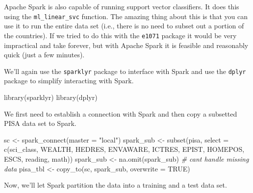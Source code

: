 \documentclass[
]{book}
\newenvironment{Shaded}{\begin{snugshade}}{\end{snugshade}}
\newcommand{\AttributeTok}[1]{\textcolor[rgb]{0.77,0.63,0.00}{#1}}
\newcommand{\CommentTok}[1]{\textcolor[rgb]{0.56,0.35,0.01}{\textit{#1}}}
\newcommand{\ConstantTok}[1]{\textcolor[rgb]{0.00,0.00,0.00}{#1}}
\newcommand{\DecValTok}[1]{\textcolor[rgb]{0.00,0.00,0.81}{#1}}
\newcommand{\FunctionTok}[1]{\textcolor[rgb]{0.00,0.00,0.00}{#1}}
\newcommand{\NormalTok}[1]{#1}
\newcommand{\OtherTok}[1]{\textcolor[rgb]{0.56,0.35,0.01}{#1}}
\newcommand{\SpecialCharTok}[1]{\textcolor[rgb]{0.00,0.00,0.00}{#1}}
\newcommand{\StringTok}[1]{\textcolor[rgb]{0.31,0.60,0.02}{#1}}
\begin{document}
Apache Spark is also capable of running support vector classifiers. It does this using the \texttt{ml\_linear\_svc} function. The amazing thing about this is that you can use it to run the entire data set (i.e., there is no need to subset out a portion of the countries). If we tried to do this with the \texttt{e1071} package it would be very impractical and take forever, but with Apache Spark it is feasible and reasonably quick (just a few minutes).

We'll again use the \texttt{sparklyr} package to interface with Spark and use the \texttt{dplyr} package to simplify interacting with Spark.

\begin{Shaded}
\begin{Highlighting}[]
\FunctionTok{library}\NormalTok{(sparklyr)}
\FunctionTok{library}\NormalTok{(dplyr)}
\end{Highlighting}
\end{Shaded}

We first need to establish a connection with Spark and then copy a subsetted PISA data set to Spark.

\begin{Shaded}
\begin{Highlighting}[]
\NormalTok{sc }\OtherTok{\textless{}{-}} \FunctionTok{spark\_connect}\NormalTok{(}\AttributeTok{master =} \StringTok{"local"}\NormalTok{)}
\NormalTok{spark\_sub }\OtherTok{\textless{}{-}} \FunctionTok{subset}\NormalTok{(pisa, }
                    \AttributeTok{select =} \FunctionTok{c}\NormalTok{(sci\_class, WEALTH, HEDRES, ENVAWARE, ICTRES,}
\NormalTok{                               EPIST, HOMEPOS, ESCS, reading, math))}
\NormalTok{spark\_sub }\OtherTok{\textless{}{-}} \FunctionTok{na.omit}\NormalTok{(spark\_sub) }\CommentTok{\# can\textquotesingle{}t handle missing data}
\NormalTok{pisa\_tbl }\OtherTok{\textless{}{-}} \FunctionTok{copy\_to}\NormalTok{(sc, spark\_sub, }\AttributeTok{overwrite =} \ConstantTok{TRUE}\NormalTok{)}
\end{Highlighting}
\end{Shaded}

Now, we'll let Spark partition the data into a training and a test data set.

\begin{Shaded}
\end{Shaded}
\end{document}
